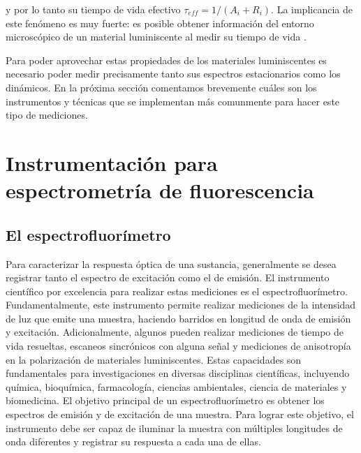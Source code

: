 \noindent y por lo tanto su tiempo de vida efectivo $\tau_{eff} = 1/(A_i + R_i)$. 
La implicancia de este fenómeno es muy fuerte: es posible obtener información del entorno microscópico de un material luminiscente al medir su tiempo de vida \cite{ryder_timedomain_2001}.

Para poder aprovechar estas propiedades de los materiales luminiscentes es necesario poder medir precisamente tanto sus espectros estacionarios como los dinámicos. 
En la próxima sección comentamos brevemente cuáles son los instrumentos y técnicas que se implementan más comunmente para hacer este tipo de mediciones.


\section{Instrumentación para espectrometría de fluorescencia}

\subsection{El espectrofluorímetro}

Para caracterizar la respuesta óptica de una sustancia, generalmente se desea registrar tanto el espectro de excitación como el de emisión. 
El instrumento científico por excelencia para realizar estas mediciones es el espectrofluorímetro. 
Fundamentalmente, este instrumento permite realizar mediciones de la intensidad de luz que emite una muestra, haciendo barridos en longitud de onda de emisión y excitación.
Adicionalmente, algunos pueden realizar mediciones de tiempo de vida resueltas, escaneos sincrónicos con alguna señal y mediciones de anisotropía en la polarización de materiales luminiscentes.
Estas capacidades son fundamentales para investigaciones en diversas disciplinas científicas, incluyendo química, bioquímica, farmacología, ciencias ambientales, ciencia de materiales y biomedicina.
El objetivo principal de un espectrofluorímetro es obtener los espectros de emisión y de excitación de una muestra.
Para lograr este objetivo, el instrumento debe ser capaz de iluminar la muestra con múltiples longitudes de onda diferentes y registrar su respuesta a cada una de ellas.

